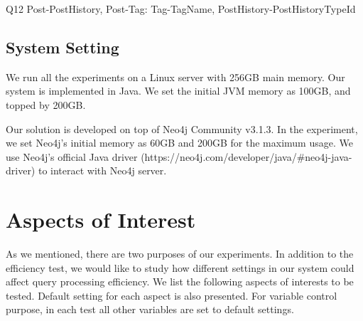Q12 \hspace{1.3mm} Post-PostHistory, Post-Tag: Tag-TagName, PostHistory-PostHistoryTypeId





\subsection{System Setting}

We run all the experiments on a Linux server with 256GB main memory. Our system is implemented in Java. We set the initial JVM memory as 100GB, and topped by 200GB.

Our solution is developed on top of Neo4j Community v3.1.3. In the experiment, we set Neo4j's initial memory as 60GB and 200GB for the maximum usage. We use Neo4j's official Java driver (https://neo4j.com/developer/java/\#neo4j-java-driver) to interact with Neo4j server.

\section{Aspects of Interest}
\label{Aspects of Interest}

As we mentioned, there are two purposes of our experiments. In addition to the efficiency test, we would like to study how different settings in our system could affect query processing efficiency. We list the following aspects of interests to be tested. Default setting for each aspect is also presented. For variable control purpose, in each test all other variables are set to default settings.

